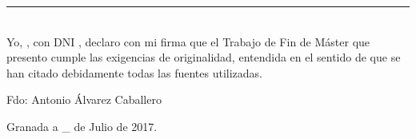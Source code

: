 \noindent\rule[-1ex]{\textwidth}{2pt}\\[4.5ex]

Yo, \textbf{\myName}, con DNI \dni, declaro con mi firma que
el Trabajo de Fin de Máster que presento cumple las exigencias de originalidad,
entendida en el sentido de que se han citado debidamente todas las fuentes
utilizadas.

\vspace{6cm}

\noindent Fdo: Antonio Álvarez Caballero

\vspace{2cm}

\begin{flushright}
Granada a \_ de Julio de 2017.
\end{flushright}


%
%
%
%
%
%
%
%
%
%
%
%

%
%
%
%
%
%
